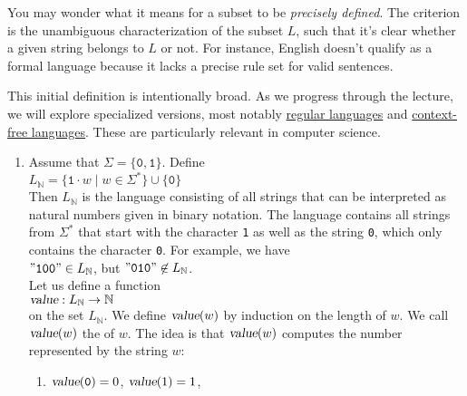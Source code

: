 You may wonder what it means for a subset to be \emph{precisely defined}. The criterion is the unambiguous characterization of the subset \( L \), such that it's clear whether a given string belongs to \( L \) or not. For instance, English doesn't qualify as a formal language because it lacks a precise rule set for valid sentences.

This initial definition is intentionally broad. As we progress through the lecture, we will explore specialized versions, most notably \href{http://en.wikipedia.org/wiki/Regular_language}{regular languages}  and \href{http://en.wikipedia.org/wiki/Context-free_language}{context-free languages}.  These are particularly relevant in computer science.

\examplesEng
\begin{enumerate}
\item Assume that $\Sigma = \{\mathtt{0},\mathtt{1}\}$.  Define
      \\[0.2cm]
      \hspace*{1.3cm}
      $L_\mathbb{N} = \{ \mathtt{1} \cdot w \mid w \in \Sigma^* \} \cup \{ \mathtt{0} \}$
      \\[0.2cm]
      Then $L_\mathbb{N}$ is the language consisting of all strings that can be interpreted as
      natural numbers given in binary notation.  The language contains all strings from $\Sigma^*$  that start with 
      the character \texttt{1} as well as the string \texttt{0}, which only contains the character
      \texttt{0}.  For example, we have
      \\[0.2cm]
      \hspace*{1.3cm}
      $\mathtt{\symbol{34}100\symbol{34}} \in L_\mathbb{N}$, \quad but \quad $\mathtt{\symbol{34}010\symbol{34}} \not\in L_\mathbb{N}$.
      \\[0.2cm]
      Let us define a function 
      \\[0.2cm]
      \hspace*{1.3cm}
      $\textsl{value}: L_\mathbb{N} \rightarrow \mathbb{N}$
      \\[0.2cm]
      on the set $L_\mathbb{N}$.  We define $\textsl{value}(w)$ by induction on the length of $w$.
      We call $\textsl{value}(w)$ the  of $w$.  The idea is that
      $\textsl{value}(w)$ computes the number represented by the string $w$:
      \begin{enumerate}
      \item $\textsl{value}(\mathtt{0}) = 0$, $\textsl{value}(1) = 1$,

\end{enumerate}
\end{enumerate}
